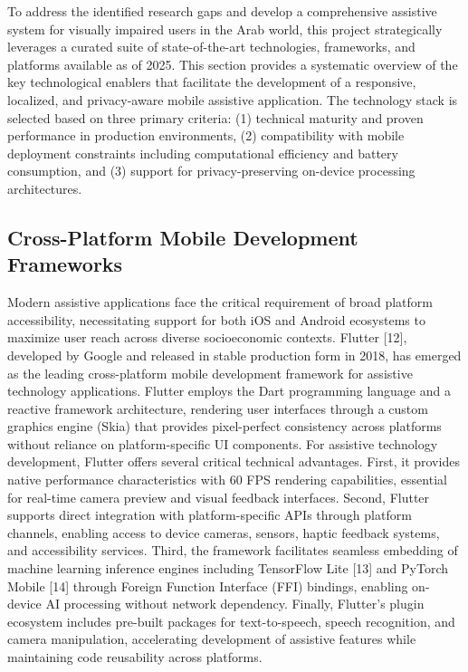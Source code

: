 \documentclass[12pt,a4paper]{report}
\begin{document}
To address the identified research gaps and develop a comprehensive assistive system for visually impaired users in the Arab world, this project strategically leverages a curated suite of state-of-the-art technologies, frameworks, and platforms available as of 2025. This section provides a systematic overview of the key technological enablers that facilitate the development of a responsive, localized, and privacy-aware mobile assistive application. The technology stack is selected based on three primary criteria: (1) technical maturity and proven performance in production environments, (2) compatibility with mobile deployment constraints including computational efficiency and battery consumption, and (3) support for privacy-preserving on-device processing architectures.

\subsection{Cross-Platform Mobile Development Frameworks}

Modern assistive applications face the critical requirement of broad platform accessibility, necessitating support for both iOS and Android ecosystems to maximize user reach across diverse socioeconomic contexts. Flutter [12], developed by Google and released in stable production form in 2018, has emerged as the leading cross-platform mobile development framework for assistive technology applications. Flutter employs the Dart programming language and a reactive framework architecture, rendering user interfaces through a custom graphics engine (Skia) that provides pixel-perfect consistency across platforms without reliance on platform-specific UI components. For assistive technology development, Flutter offers several critical technical advantages. First, it provides native performance characteristics with 60 FPS rendering capabilities, essential for real-time camera preview and visual feedback interfaces. Second, Flutter supports direct integration with platform-specific APIs through platform channels, enabling access to device cameras, sensors, haptic feedback systems, and accessibility services. Third, the framework facilitates seamless embedding of machine learning inference engines including TensorFlow Lite [13] and PyTorch Mobile [14] through Foreign Function Interface (FFI) bindings, enabling on-device AI processing without network dependency. Finally, Flutter's plugin ecosystem includes pre-built packages for text-to-speech, speech recognition, and camera manipulation, accelerating development of assistive features while maintaining code reusability across platforms.
\end{document}

